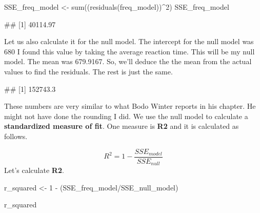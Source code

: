 \documentclass[
]{book}
\newenvironment{Shaded}{\begin{snugshade}}{\end{snugshade}}
\newcommand{\DecValTok}[1]{\textcolor[rgb]{0.00,0.00,0.81}{#1}}
\newcommand{\FunctionTok}[1]{\textcolor[rgb]{0.00,0.00,0.00}{#1}}
\newcommand{\NormalTok}[1]{#1}
\newcommand{\OtherTok}[1]{\textcolor[rgb]{0.56,0.35,0.01}{#1}}
\newcommand{\SpecialCharTok}[1]{\textcolor[rgb]{0.00,0.00,0.00}{#1}}
\begin{document}
\begin{Shaded}
\begin{Highlighting}[]
\NormalTok{SSE\_freq\_model }\OtherTok{\textless{}{-}} \FunctionTok{sum}\NormalTok{((}\FunctionTok{residuals}\NormalTok{(freq\_model))}\SpecialCharTok{\^{}}\DecValTok{2}\NormalTok{)}
\NormalTok{SSE\_freq\_model}
\end{Highlighting}
\end{Shaded}

\begin{Shaded}
\begin{Highlighting}[]
\NormalTok{\#\# [1] 40114.97}
\end{Highlighting}
\end{Shaded}

Let us also calculate it for the null model. The intercept for the null model was 680 I found this value by taking the average reaction time. This will be my null model. The mean was 679.9167. So, we'll deduce the the mean from the actual values to find the residuals. The rest is just the same.

\begin{Shaded}
\end{Shaded}

\begin{Shaded}
\begin{Highlighting}[]
\NormalTok{\#\# [1] 152743.3}
\end{Highlighting}
\end{Shaded}

These numbers are very similar to what Bodo Winter reports in his chapter. He might not have done the rounding I did. We use the null model to calculate a \textbf{standardized measure of fit}. One measure is \textbf{R2} and it is calculated as follows.

\[R^2 = 1 - \frac{SSE_{model}}{SSE_{null}} \]
Let's calculate \textbf{R2}.

\begin{Shaded}
\begin{Highlighting}[]
\NormalTok{r\_squared }\OtherTok{\textless{}{-}} \DecValTok{1} \SpecialCharTok{{-}}\NormalTok{ (SSE\_freq\_model}\SpecialCharTok{/}\NormalTok{SSE\_null\_model)}

\NormalTok{r\_squared}
\end{Highlighting}
\end{Shaded}
\end{document}

